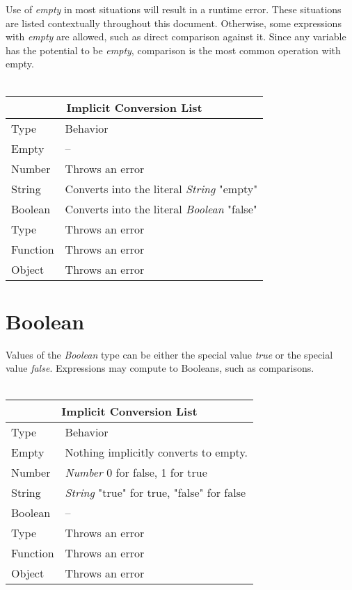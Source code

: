 \documentclass[12pt,letterpaper]{report}
\begin{document}
Use of \textit{empty} in most situations will result in a runtime error. These situations 
are listed contextually throughout this document. Otherwise, some expressions with 
\textit{empty} are allowed, such as direct comparison against it. Since any variable 
has the potential to be \textit{empty}, comparison is the most common operation with 
empty.
\\\\
{
\centering
\begin{tabular}{ |p{2.5cm}||p{10cm}|  }
  \hline
  \multicolumn{2}{|c|}{Implicit Conversion List} \\
  \hline
  Type & Behavior\\
  \hline
  Empty & --\\
  Number  & Throws an error \\
  String & Converts into the literal \textit{String} "empty"\\
  Boolean & Converts into the literal \textit{Boolean} "false"\\
  Type & Throws an error\\
  Function & Throws an error\\
  Object & Throws an error\\
 \hline
\end{tabular}
}



\section{Boolean}\label{Boolean}

Values of the \textit{Boolean} type can be either the special value \textit{true} or 
the special value \textit{false}. Expressions may compute to Booleans, such 
as comparisons.
\\\\
{
\centering
\begin{tabular}{ |p{2.5cm}||p{10cm}|  }
  \hline
  \multicolumn{2}{|c|}{Implicit Conversion List} \\
  \hline
  Type & Behavior\\
  \hline
  Empty & Nothing implicitly converts to empty.\\
  Number  & \textit{Number} 0 for false, 1 for true \\
  String & \textit{String} "true" for true, "false" for false\\
  Boolean & -- \\
  Type & Throws an error\\
  Function & Throws an error\\
  Object & Throws an error\\
 \hline
\end{tabular}
}
\end{document}
